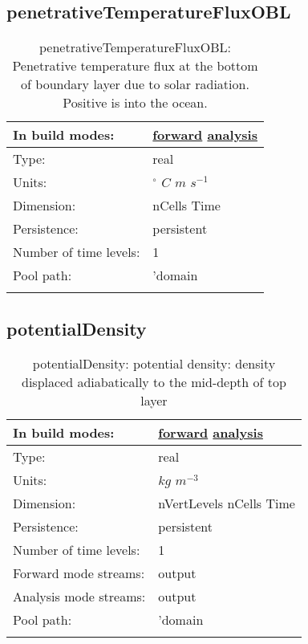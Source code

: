 \subsection[penetrativeTemperatureFluxOBL]{penetrativeTemperatureFluxOBL}
\label{subsec:var_sec_diagnostics_penetrativeTemperatureFluxOBL}
\begin{center}
\begin{longtable}{| p{2.0in} | p{4.0in} |}
        \hline 
        In build modes: & \hyperref[subsec:forward_var_tab_diagnostics]{forward} \hyperref[subsec:analysis_var_tab_diagnostics]{analysis} \\
        \hline 
        Type: & real \\
        \hline 
        Units: & $^\circ$ $C$ $m$ $s^{-1}$ \\
        \hline 
        Dimension: & nCells Time \\
        \hline 
        Persistence: & persistent \\
        \hline 
        Number of time levels: & 1 \\
        \hline 
            Pool path: & 'domain %
 \\
		 \hline 
    \caption{penetrativeTemperatureFluxOBL: Penetrative temperature flux at the bottom of boundary layer due to solar radiation. Positive is into the ocean.}
\end{longtable}
\end{center}
\subsection[potentialDensity]{potentialDensity}
\label{subsec:var_sec_diagnostics_potentialDensity}
\begin{center}
\begin{longtable}{| p{2.0in} | p{4.0in} |}
        \hline 
        In build modes: & \hyperref[subsec:forward_var_tab_diagnostics]{forward} \hyperref[subsec:analysis_var_tab_diagnostics]{analysis} \\
        \hline 
        Type: & real \\
        \hline 
        Units: & $kg$ $m^{-3}$ \\
        \hline 
        Dimension: & nVertLevels nCells Time \\
        \hline 
        Persistence: & persistent \\
        \hline 
        Number of time levels: & 1 \\
        \hline 
		 Forward mode streams: &  output \\
        \hline 
		 Analysis mode streams: &  output \\
        \hline 
            Pool path: & 'domain %
 \\
		 \hline 
    \caption{potentialDensity: potential density: density displaced adiabatically to the mid-depth of top layer}
\end{longtable}
\end{center}
